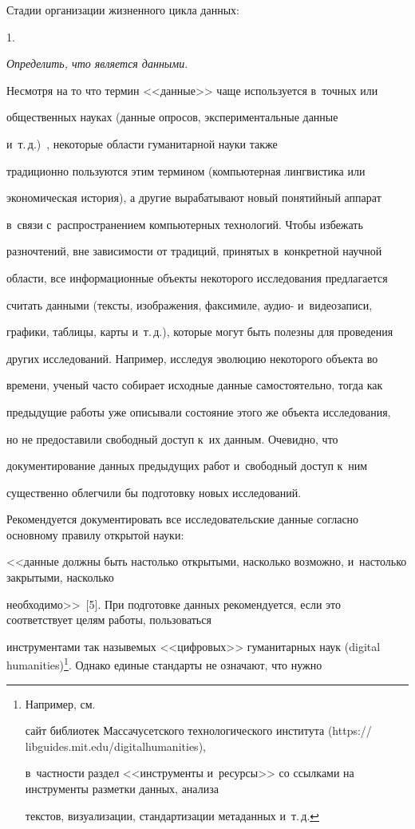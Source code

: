   

  Стадии организации жизненного цикла данных:



  1. 

\textit{Определить, что является данными}.



  Несмотря на то что термин <<данные>> чаще используется в~точных или 

общественных науках (данные опросов, экспериментальные данные 

и~т.\,д.)~\cite{7-nur}, некоторые области гуманитарной науки также 

традиционно пользуются этим термином (компьютерная лингвистика или 

экономическая история), а другие вырабатывают новый понятийный аппарат 

в~связи с~распространением компьютерных технологий. Чтобы избежать 

разночтений, вне зависимости от традиций, принятых в~конкретной научной 

области, все информационные объекты некоторого исследования предлагается 

считать данными (тексты, изображения, факсимиле, аудио- и~видеозаписи, 

графики, таблицы, карты и~т.\,д.), которые могут быть полезны для проведения 

других исследований. Например, исследуя эволюцию некоторого объекта во 

времени, ученый часто собирает исходные данные самостоятельно, тогда как 

предыдущие работы уже описывали состояние этого же объекта исследования, 

но не предоставили свободный доступ к~их данным. Очевидно, что 

документирование данных предыдущих работ и~свободный доступ к~ним 

существенно облегчили бы подготовку новых исследований.

  

Рекомендуется документировать все исследовательские данные согласно основному правилу открытой науки: 

<<данные должны быть настолько открытыми, насколько возможно, и~настолько закрытыми, насколько 

необходимо>>~[5]. При подготовке данных рекомендуется, если это соответствует целям работы, пользоваться 

инструментами так назывемых <<цифровых>> гуманитарных наук (digital humanities)\footnote{Например, см. 

сайт библиотек Массачусетского технологического института ({\sf https:// libguides.mit.edu/digitalhumanities}), 

в~частности раздел <<инструменты и~ресурсы>> со ссылками на инструменты разметки данных, анализа 

текстов, визуализации, стандартизации метаданных и~т.\,д.}. Однако единые стандарты не означают, что нужно 

